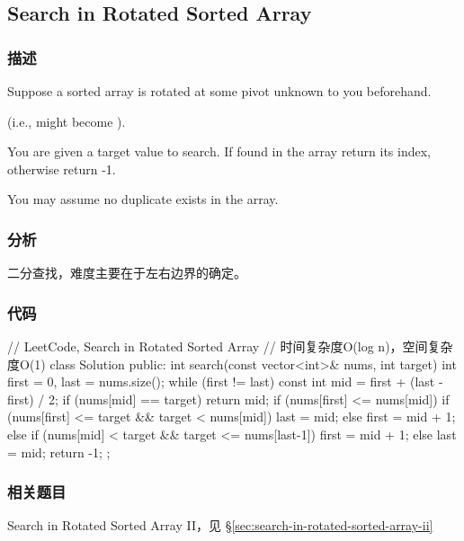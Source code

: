 \subsection{Search in Rotated Sorted Array}
\label{sec:search-in-rotated-sorted-array}


\subsubsection{描述}
Suppose a sorted array is rotated at some pivot unknown to you beforehand.

(i.e.,  might become ).

You are given a target value to search. If found in the array return its index, otherwise return -1.

You may assume no duplicate exists in the array.


\subsubsection{分析}
二分查找，难度主要在于左右边界的确定。


\subsubsection{代码}
\begin{Code}
// LeetCode, Search in Rotated Sorted Array
// 时间复杂度O(log n)，空间复杂度O(1)
class Solution {
public:
    int search(const vector<int>& nums, int target) {
        int first = 0, last = nums.size();
        while (first != last) {
            const int mid = first  + (last - first) / 2;
            if (nums[mid] == target)
                return mid;
            if (nums[first] <= nums[mid]) {
                if (nums[first] <= target && target < nums[mid])
                    last = mid;
                else
                    first = mid + 1;
            } else {
                if (nums[mid] < target && target <= nums[last-1])
                    first = mid + 1;
                else
                    last = mid;
            }
        }
        return -1;
    }
};
\end{Code}


\subsubsection{相关题目}

\begindot
\item Search in Rotated Sorted Array II，见 \S \ref{sec:search-in-rotated-sorted-array-ii}
\myenddot


